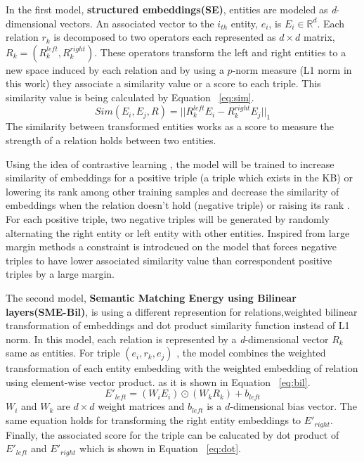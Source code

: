    In the first model, \textbf{structured embeddings(SE)}, entities are modeled as \textit{d}-dimensional vectors.
    An associated vector to the $i_{th}$ entity, $e_{i}$, is $E_{i} \in \mathbb{R}^{d}$. Each relation $r_{k}$  
    is decomposed to two operators each represented as $d \times d$ matrix, $ R_k = (R_{k}^{left}, R_{k}^{right})$. 
    These operators transform the left and right entities to a new space induced by each relation and by using 
    a $p$-norm measure  (L1 norm in this work) they associate a similarity value or a score to each triple. 
    This similarity value is being calculated by
    Equation ~\eqref{eq:sim}. 
    \begin{equation}
    \label{eq:sim}Sim(E_{i}, E_{j}, R) = ||R_{k}^{left}E_{i} - R_{k}^{right}E_{j} ||_{1}
    \end{equation}
    The similarity between transformed entities works as a score to measure the strength of a relation holds between two entities. 
      
    Using the idea of contrastive learning , the model will be trained to increase similarity of 
    embeddings for a positive triple (a triple which exists in the KB) or lowering its rank among other training samples
    and decrease the similarity of embeddings when the relation doesn't hold (negative triple) or raising its rank . 
    For each positive triple, two negative triples will be generated by randomly alternating the right entity or left entity with other entities.
    Inspired from large margin methods a constraint is introdcued on the model that forces 
    negative triples to have lower associated similarity value  than correspondent positive triples by a large margin.
    
    The second model, \textbf{Semantic Matching Energy using Bilinear layers(SME-Bil)}, 
    is using a different represention for relations,weighted bilinear transformation of embeddings 
    and  dot product similarity function instead of L1 norm. 
    In this model, each relation is represented by a \textit{d}-dimensional vector $R_{k}$ same as entities. 
    For triple $(e_{i},r_{k} , e_{j} )$ , the model combines the weighted transformation of each entity embedding with 
    the weighted embedding of relation using element-wise vector product. as it is shown in Equation ~\eqref{eq:bil}.
    \begin{equation}
    \label{eq:bil} E'_{left} = (W_{i} E_{i}) \odot (W_{k} R_{k}) + b_{left}
    \end{equation}
    $W_{i}$ and $W_{k}$ are $d \times d$ weight matrices and $b_{left}$ is a $d$-dimensional bias vector. 
    The same equation holds for transforming the right entity embeddings to $E'_{right}$. Finally, the associated score for the triple
     can be calucated by dot product of $E'_{left}$ and $E'_{right}$ which is shown in Equation ~\ref{eq:dot}.
    
